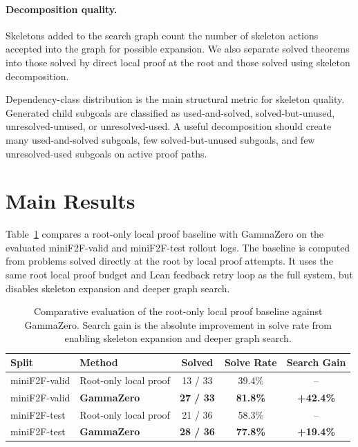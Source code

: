 \documentclass[en]{uet_awesome_thesis/uet-awesome-thesis}
\begin{document}
\paragraph{Decomposition quality.}
Skeletons added to the search graph count the number of skeleton actions accepted into the graph for possible expansion. We also separate solved theorems into those solved by direct local proof at the root and those solved using skeleton decomposition.

Dependency-class distribution is the main structural metric for skeleton quality. Generated child subgoals are classified as used-and-solved, solved-but-unused, unresolved-unused, or unresolved-used. A useful decomposition should create many used-and-solved subgoals, few solved-but-unused subgoals, and few unresolved-used subgoals on active proof paths.

\section{Main Results}

Table~\ref{tab:main-results} compares a root-only local proof baseline with GammaZero on the
evaluated miniF2F-valid and miniF2F-test rollout logs. The baseline is computed from problems solved
directly at the root by local proof attempts. It uses the same root local proof budget and Lean feedback
retry loop as the full system, but disables skeleton expansion and deeper graph search.

\begin{table}[h]
\centering
\small
\begin{tabular}{@{}llccc@{}}
\toprule
Split & Method & Solved & Solve Rate & Search Gain \\
\midrule
miniF2F-valid & Root-only local proof & 13 / 33 & 39.4\% & -- \\
miniF2F-valid & \textbf{GammaZero} & \textbf{27 / 33} & \textbf{81.8\%} & \textbf{+42.4\%} \\
\midrule
miniF2F-test & Root-only local proof & 21 / 36 & 58.3\% & -- \\
miniF2F-test & \textbf{GammaZero} & \textbf{28 / 36} & \textbf{77.8\%} & \textbf{+19.4\%} \\
\bottomrule
\end{tabular}
\caption{Comparative evaluation of the root-only local proof baseline against GammaZero. Search gain is the absolute improvement in solve rate from enabling skeleton expansion and deeper graph search.}
\label{tab:main-results}
\end{table}
\end{document}
